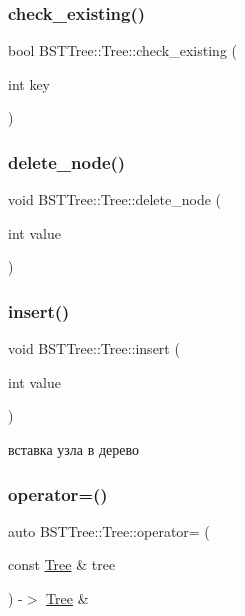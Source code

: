\subsubsection{\texorpdfstring{check\+\_\+existing()}{check\_existing()}}
{\footnotesize\ttfamily bool B\+S\+T\+Tree\+::\+Tree\+::check\+\_\+existing (\begin{DoxyParamCaption}\item[{int}]{key }\end{DoxyParamCaption})}

\mbox{\label{class_b_s_t_tree_1_1_tree_ae1b302d3de2ca202f7b89bd46d4a7eca}} 
\subsubsection{\texorpdfstring{delete\+\_\+node()}{delete\_node()}}
{\footnotesize\ttfamily void B\+S\+T\+Tree\+::\+Tree\+::delete\+\_\+node (\begin{DoxyParamCaption}\item[{int}]{value }\end{DoxyParamCaption})}

\mbox{\label{class_b_s_t_tree_1_1_tree_a4f6816912547a485ab853eb125e261a2}} 
\subsubsection{\texorpdfstring{insert()}{insert()}}
{\footnotesize\ttfamily void B\+S\+T\+Tree\+::\+Tree\+::insert (\begin{DoxyParamCaption}\item[{int}]{value }\end{DoxyParamCaption})}

вставка узла в дерево \mbox{\label{class_b_s_t_tree_1_1_tree_a4310f8ce5de32401811946bb20b5e634}} 
\subsubsection{\texorpdfstring{operator=()}{operator=()}\hspace{0.1cm}{\footnotesize\ttfamily [1/2]}}
{\footnotesize\ttfamily auto B\+S\+T\+Tree\+::\+Tree\+::operator= (\begin{DoxyParamCaption}\item[{const \mbox{\hyperlink{class_b_s_t_tree_1_1_tree}{Tree}} \&}]{tree }\end{DoxyParamCaption}) -\/$>$  \mbox{\hyperlink{class_b_s_t_tree_1_1_tree}{Tree}} \&}

